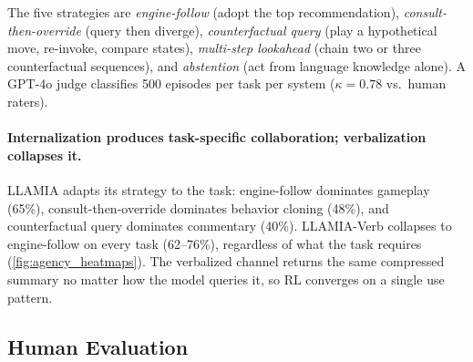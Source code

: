 The five strategies are \emph{engine-follow} (adopt the top recommendation), \emph{consult-then-override} (query then diverge), \emph{counterfactual query} (play a hypothetical move, re-invoke, compare states), \emph{multi-step lookahead} (chain two or three counterfactual sequences), and \emph{abstention} (act from language knowledge alone). A GPT-4o judge classifies 500 episodes per task per system ($\kappa{=}0.78$ vs.\ human raters).

\paragraph{Internalization produces task-specific collaboration; verbalization collapses it.}
LLAMIA adapts its strategy to the task: engine-follow dominates gameplay (65\%), consult-then-override dominates behavior cloning (48\%), and counterfactual query dominates commentary (40\%). LLAMIA-Verb collapses to engine-follow on every task (62--76\%), regardless of what the task requires (\cref{fig:agency_heatmaps}). The verbalized channel returns the same compressed summary no matter how the model queries it, so RL converges on a single use pattern.







\subsection{Human Evaluation}
\label{sec:results_human}

